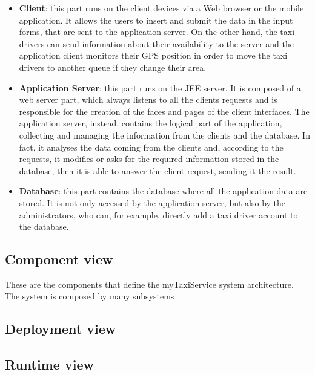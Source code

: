 			\begin{itemize}
				\item \textbf{Client}: this part runs on the client devices via a Web browser or the mobile application. It allows the users to insert and submit the data in the input forms, that are sent to the application server. On the other hand, the taxi drivers can send information about their availability to the server and the application client monitors their GPS position in order to move the taxi drivers to another queue if they change their area. 
				\item \textbf{Application Server}: this part runs on the JEE server. It is composed of a web server part, which always listens to all the clients requests and is responsible for the creation of the faces and pages of the client interfaces. The application server, instead, contains the logical part of the application, collecting and managing the information from the clients and the database. In fact, it analyses the data coming from the clients and, according to the requests, it modifies or asks for the required information stored in the database, then it is able to answer the client request, sending it the result.  
				\item \textbf{Database}: this part contains the database where all the application data are stored. It is not only accessed by the application server, but also by the administrators, who can, for example, directly add a taxi driver account to the database. 
			\end{itemize}	
			
	\newpage
		\subsection{Component view}
		These are the components that define the myTaxiService system architecture. The system is composed by many subsystems 
	\newpage	
		\subsection{Deployment view}
	\newpage
		\subsection{Runtime view}
	\newpage
